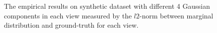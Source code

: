 \documentclass[11pt]{article}
\begin{document}
\begin{figure}
\caption{The empirical results on synthetic dataset with different 4 Gaussian components in each view measured by the $l2$-norm between marginal distribution and ground-truth for each view.}
\end{figure}
\end{document}
